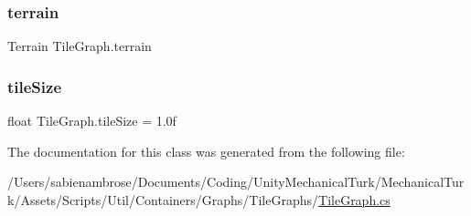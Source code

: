 \mbox{\label{class_tile_graph_a064f51b86f086091ec4b9fff14c554e2}} 
\subsubsection{\texorpdfstring{terrain}{terrain}}
{\footnotesize\ttfamily Terrain Tile\+Graph.\+terrain}

\mbox{\label{class_tile_graph_ae6728f48acf48baa4400f8829cc29bc3}} 
\subsubsection{\texorpdfstring{tile\+Size}{tileSize}}
{\footnotesize\ttfamily float Tile\+Graph.\+tile\+Size = 1.\+0f}



The documentation for this class was generated from the following file\+:\begin{DoxyCompactItemize}
\item 
/\+Users/sabienambrose/\+Documents/\+Coding/\+Unity\+Mechanical\+Turk/\+Mechanical\+Turk/\+Assets/\+Scripts/\+Util/\+Containers/\+Graphs/\+Tile\+Graphs/\mbox{\hyperlink{_tile_graph_8cs}{Tile\+Graph.\+cs}}\end{DoxyCompactItemize}
